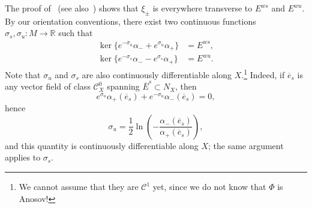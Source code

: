 \documentclass[letterpaper, 11pt]{article}
\numberwithin{equation}{section}
\newcommand{\R}{\mathbb{R}}
\begin{document}
The proof of~\cite[Proposition 2.2.6]{ET} (see also~\cite[Remark 3.10]{H22a}) shows that $\xi_\pm$ is everywhere transverse to $E^{ws}$ and $E^{wu}$. By our orientation conventions, there exist two continuous functions $\sigma_s, \sigma_u :  M \rightarrow \R$ such that
\begin{align*}
    \ker\big\{e^{-\sigma_u} \alpha_- + e^{\sigma_u} \alpha_+ \big\} &= E^{ws}, \\
    \ker\big\{e^{-\sigma_s} \alpha_- -e^{\sigma_s} \alpha_+\big\} &= E^{wu}.
\end{align*}
Note that $\sigma_u$ and $\sigma_s$ are also continuously differentiable along $X$.\footnote{We cannot assume that they are $\mathcal{C}^1$ yet, since we do not know that $\Phi$ is Anosov!} Indeed, if $\overline{e}_s$ is any vector field of class $\mathcal{C}^0_X$ spanning $\overline{E}^s \subset N_X$, then $$e^{\sigma_u} \alpha_+(\overline{e}_s) + e^{-\sigma_u}\alpha_-(\overline{e}_s)=0,$$ hence $$\sigma_u = \frac{1}{2} \ln \left(-\frac{\alpha_-(\overline{e}_s)}{\alpha_+(\overline{e}_s)} \right),$$ and this quantity is continuously differentiable along $X$; the same argument applies to $\sigma_s$.
\end{document}
